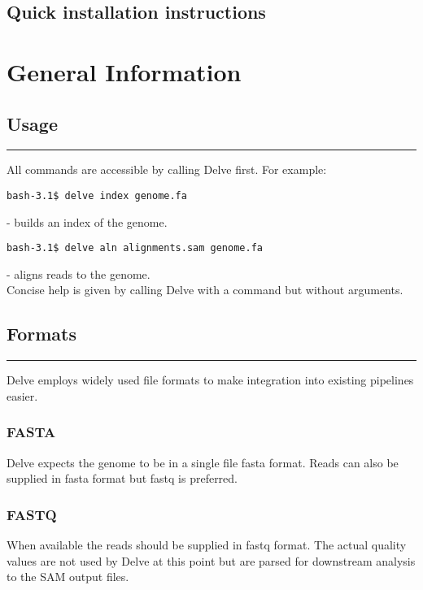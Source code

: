 \documentclass[11pt,a4paper,oneside]{book}
\begin{document}
\section*{Quick installation instructions}


\chapter*{General Information}
\setcounter{chapter}{2}
\setcounter{section}{0}
  
\section{Usage}
\rule[1cm]{\textwidth}{1pt}

All commands are accessible by calling Delve first. For example: 

\begin{verbatim}
bash-3.1$ delve index genome.fa 
\end{verbatim}
 - builds an index of the genome.
\begin{verbatim}
bash-3.1$ delve aln alignments.sam genome.fa
\end{verbatim}
- aligns reads to the genome.\\

Concise help is given by calling Delve with a command but without arguments.

\section{Formats}
\rule[1cm]{\textwidth}{1pt}
Delve employs widely used file formats to make integration into existing pipelines easier.\\
\subsection{FASTA}
Delve expects the genome to be in a single file fasta format. Reads can also be supplied in fasta format but fastq is preferred.\\

\subsection{FASTQ}
When available the reads should be supplied in fastq\cite{Cock:2009p3196} format. The actual quality values are not used by Delve at this point but are parsed for downstream analysis to the SAM output files.\\  
\end{document}
